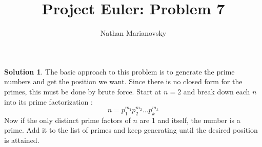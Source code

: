 \documentclass[12pt, letterpaper, onecolumn, conference, final]{IEEEtran}
\title{Project Euler: Problem 7}
\author{Nathan Marianovsky}
\theoremstyle{definition}
\newtheorem*{problem*}{Problem}
\newtheorem*{solution*}{Solution}
\theoremstyle{plain}
\begin{document}
\maketitle

\begin{center}
\end{center}

\vspace{.3cm}
\begin{solution*}
The basic approach to this problem is to generate the prime numbers and get the position we want. Since there is no closed form for the primes, this must be done by brute force. Start at $n=2$ and break down each $n$ into its prime factorization \footnotemark:
\begin{equation*}
n = p_1^{m_1} p_2^{m_2} \dots p_k^{m_k}
\end{equation*}
Now if the only distinct prime factors of $n$ are 1 and itself, the number is a prime. Add it to the list of primes and keep generating until the desired position is attained.
\end{solution*}

\end{document}
